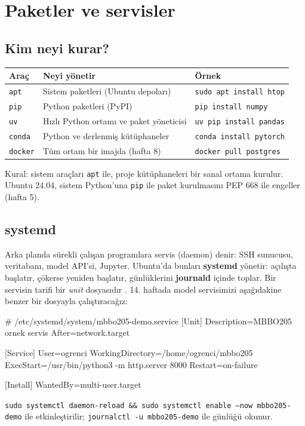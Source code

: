 \documentclass[11pt,a4paper]{article}
\begin{document}
\section{Paketler ve servisler}

\subsection{Kim neyi kurar?}
\begin{center}
\begin{tabularx}{\textwidth}{@{}l Y l@{}}
\toprule
\textbf{Araç} & \textbf{Neyi yönetir} & \textbf{Örnek} \\
\midrule
\texttt{apt} & Sistem paketleri (Ubuntu depoları) & \texttt{sudo apt install htop} \\
\texttt{pip} & Python paketleri (PyPI) & \texttt{pip install numpy} \\
\texttt{uv} & Hızlı Python ortamı ve paket yöneticisi & \texttt{uv pip install pandas} \\
\texttt{conda} & Python ve derlenmiş kütüphaneler & \texttt{conda install pytorch} \\
\texttt{docker} & Tüm ortam bir imajda (hafta 8) & \texttt{docker pull postgres} \\
\bottomrule
\end{tabularx}
\end{center}
Kural: sistem araçları \texttt{apt} ile, proje kütüphaneleri bir sanal ortama kurulur. Ubuntu 24.04, sistem Python'una \texttt{pip} ile paket kurulmasını PEP 668 ile engeller (hafta 5).

\subsection{systemd}
Arka planda sürekli çalışan programlara servis (daemon) denir: SSH sunucusu, veritabanı, model API'si, Jupyter. Ubuntu'da bunları \textbf{systemd} yönetir: açılışta başlatır, çökerse yeniden başlatır, günlüklerini \textbf{journald} içinde toplar. Bir servisin tarifi bir \emph{unit} dosyasıdır \cite{systemd}. 14. haftada model servisimizi aşağıdakine benzer bir dosyayla çalıştıracağız:
\begin{kodblok}
# /etc/systemd/system/mbbo205-demo.service
[Unit]
Description=MBBO205 ornek servis
After=network.target

[Service]
User=ogrenci
WorkingDirectory=/home/ogrenci/mbbo205
ExecStart=/usr/bin/python3 -m http.server 8000
Restart=on-failure

[Install]
WantedBy=multi-user.target
\end{kodblok}
\texttt{sudo systemctl daemon-reload \&\& sudo systemctl enable --now mbbo205-demo} ile etkinleştirilir; \texttt{journalctl -u mbbo205-demo} ile günlüğü okunur.
\end{document}
